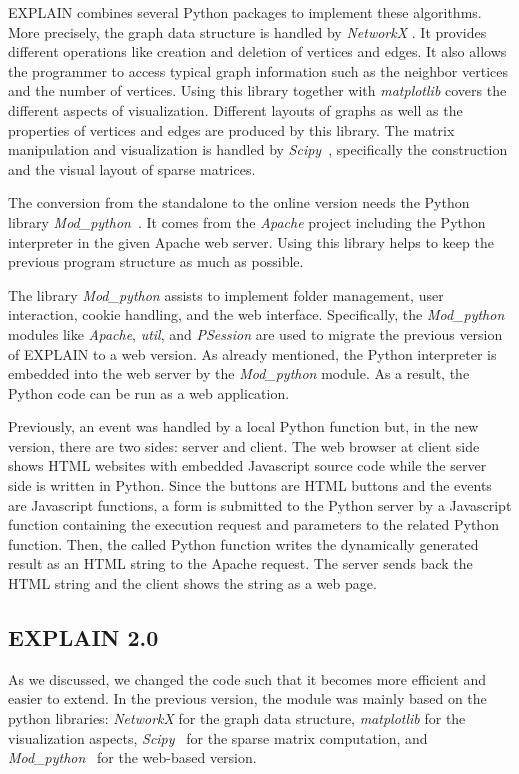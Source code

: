 \documentclass[12pt, twoside]{book}
\begin{document}
\mbox{EXPLAIN} combines several Python packages to implement these algorithms. More precisely, the graph data structure is handled by \textit{NetworkX} \cite{networkx2008}. It provides different operations like creation and deletion of vertices and edges. It also allows the programmer to access typical graph information such as the neighbor vertices and the number of vertices. Using this library together with \textit{matplotlib} \cite{matplotlib2007} covers the different aspects of visualization. Different layouts of graphs as well as the properties of vertices and edges are produced by this library. The matrix manipulation and visualization is handled by \textit{Scipy}~\cite{scipy2001}, specifically the construction and the visual layout of sparse matrices.

The conversion from the standalone to the online version needs the Python library \textit{Mod\_python}~\cite{modpython2013}. It comes from the \textit{Apache} project including the Python interpreter in the given Apache web server. Using this library helps to keep the previous program structure as much as possible.

The library \textit{Mod\_python} assists to implement folder management, user interaction, cookie handling, and the web interface. Specifically, the \textit{Mod\_python} modules like \textit{Apache}, \textit{util}, and \textit{PSession} are used to migrate the previous version of \mbox{EXPLAIN} to a web version. As already mentioned, the Python interpreter is embedded into the web server by the \textit{Mod\_python} module. As a result, the Python code can be run as a web application.

Previously, an event was handled by a local Python function but, in the new version, there are two sides: server and client. The web browser at client side shows HTML websites with embedded Javascript source code while the server side is written in Python. Since the buttons are HTML buttons and the events are Javascript functions, a form is submitted to the Python server by a Javascript function containing the execution request and parameters to the related Python function. Then, the called Python function writes the dynamically generated result as an HTML string to the Apache request. The server sends back the HTML string and the client shows the string as a web page.

\subsection{EXPLAIN 2.0}
\label{s.impl.explain2}
As we discussed, we changed the code such that it becomes more efficient and easier to extend.
In the previous version, the module was mainly based on the python libraries:
\textit{NetworkX} \cite{networkx2008} for the graph data structure,
\textit{matplotlib} \cite{matplotlib2007} for the visualization aspects,
\textit{Scipy}~\cite{scipy2001} for the sparse matrix computation, and
\textit{Mod\_python}~\cite{modpython2013} for the web-based version.
\end{document}
